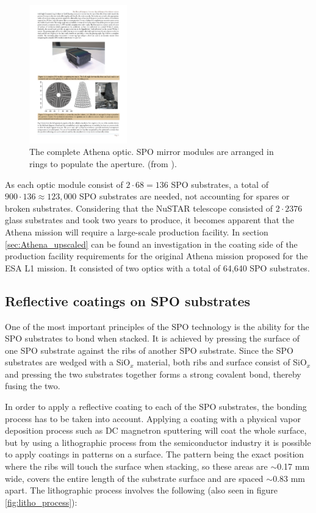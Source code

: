 \begin{figure}[!h]
  \center
  \includegraphics[height=6cm]{figures/athena/athena_full_optic.pdf}
\caption{\footnotesize The complete Athena optic. SPO mirror modules are arranged in rings to populate the aperture. (from \cite{Willingale:2013vo}).}\label{fig:Athena_full_optic}
\end{figure}

As each optic module consist of $2 \cdot 68 = 136$ SPO substrates, a total of $900 \cdot 136 \approx 123,000$ SPO substrates are needed, not accounting for spares or broken substrates. Considering that the NuSTAR telescope consisted of $2\cdot2376$ glass substrates and took two years to produce, it becomes apparent that the Athena mission will require a large-scale production facility. In section \ref{sec:Athena_upscaled} can be found an investigation in the coating side of the production facility requirements for the original Athena mission proposed for the ESA L1 mission. It consisted of two optics with a total of 64,640 SPO substrates.

\subsection{Reflective coatings on SPO substrates}
One of the most important principles of the SPO technology is the ability for the SPO substrates to bond when stacked. It is achieved by pressing the surface of one SPO substrate against the ribs of another SPO substrate. Since the SPO substrates are wedged with a SiO$_x$ material, both ribs and surface consist of SiO$_x$ and pressing the two substrates together forms a strong covalent bond, thereby fusing the two.

In order to apply a reflective coating to each of the SPO substrates, the bonding process has to be taken into account. Applying a coating with a physical vapor deposition process such as DC magnetron sputtering will coat the whole surface, but by using a lithographic process from the semiconductor industry it is possible to apply coatings in patterns on a surface. The pattern being the exact position where the ribs will touch the surface when stacking, so these areas are $\sim$0.17 mm wide, covers the entire length of the substrate surface and are spaced $\sim$0.83 mm apart. The lithographic process involves the following (also seen in figure \ref{fig:litho_process}):

